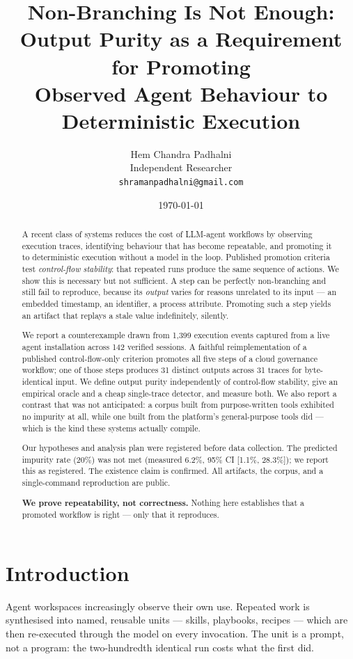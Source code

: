 \documentclass[10pt,conference]{article}
\title{\textbf{Non-Branching Is Not Enough:\\
Output Purity as a Requirement for Promoting\\
Observed Agent Behaviour to Deterministic Execution}}
\author{
  Hem Chandra Padhalni\\
  \small Independent Researcher\\
  \small \texttt{shramanpadhalni@gmail.com}
}
\date{\today}
\begin{document}
\maketitle

\begin{abstract}
A recent class of systems reduces the cost of LLM-agent workflows by observing
execution traces, identifying behaviour that has become repeatable, and
promoting it to deterministic execution without a model in the loop. Published
promotion criteria test \emph{control-flow stability}: that repeated runs
produce the same sequence of actions. We show this is necessary but not
sufficient. A step can be perfectly non-branching and still fail to reproduce,
because its \emph{output} varies for reasons unrelated to its input --- an
embedded timestamp, an identifier, a process attribute. Promoting such a step
yields an artifact that replays a stale value indefinitely, silently.

We report a counterexample drawn from 1{,}399 execution events captured from a
live agent installation across 142 verified sessions. A faithful
reimplementation of a published control-flow-only criterion promotes all five
steps of a cloud governance workflow; one of those steps produces 31 distinct
outputs across 31 traces for byte-identical input. We define output purity
independently of control-flow stability, give an empirical oracle and a cheap
single-trace detector, and measure both. We also report a contrast that was not
anticipated: a corpus built from purpose-written tools exhibited no impurity at
all, while one built from the platform's general-purpose tools did --- which is
the kind these systems actually compile.

Our hypotheses and analysis plan were registered before data collection. The
predicted impurity rate (20\%) was not met (measured 6.2\%, 95\% CI [1.1\%,
28.3\%]); we report this as registered. The existence claim is confirmed. All
artifacts, the corpus, and a single-command reproduction are public.

\textbf{We prove repeatability, not correctness.} Nothing here establishes that
a promoted workflow is right --- only that it reproduces.
\end{abstract}

\section{Introduction}
\label{sec:intro}

Agent workspaces increasingly observe their own use. Repeated work is
synthesised into named, reusable units --- skills, playbooks, recipes --- which
are then re-executed through the model on every invocation. The unit is a
prompt, not a program: the two-hundredth identical run costs what the first did.
\end{document}
